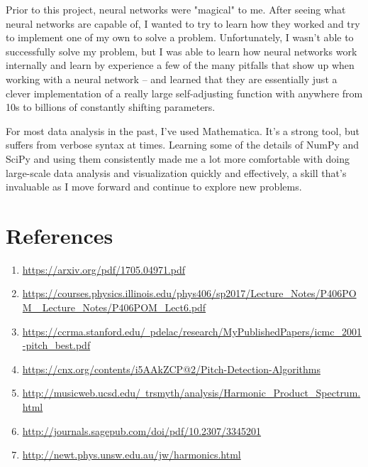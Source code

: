 \documentclass[12pt]{article}
\begin{document}
Prior to this project, neural networks were "magical" to me. After seeing what neural networks are capable of, I wanted to try to learn how they worked and try to implement one of my own to solve a problem. Unfortunately, I wasn't able to successfully solve my problem, but I was able to learn how neural networks work internally and learn by experience a few of the many pitfalls that show up when working with a neural network -- and learned that they are essentially just a clever implementation of a really large self-adjusting function with anywhere from 10s to billions of constantly shifting parameters.

For most data analysis in the past, I've used Mathematica. It's a strong tool, but suffers from verbose syntax at times. Learning some of the details of NumPy and SciPy and using them consistently made me a lot more comfortable with doing large-scale data analysis and visualization quickly and effectively, a skill that's invaluable as I move forward and continue to explore new problems.

\section{References}
\begin{enumerate}
	\item
	\href{https://arxiv.org/pdf/1705.04971.pdf}{https://arxiv.org/pdf/1705.04971.pdf}
	\item \href{https://courses.physics.illinois.edu/phys406/sp2017/Lecture_Notes/P406POM_Lecture_Notes/P406POM_Lect6.pdf}{https://courses.physics.illinois.edu/phys406/sp2017/Lecture\_Notes/P406POM\_ Lecture\_Notes/P406POM\_Lect6.pdf}
	\item
	\href{https://ccrma.stanford.edu/~pdelac/research/MyPublishedPapers/icmc_2001-pitch_best.pdf}{https://ccrma.stanford.edu/~pdelac/research/MyPublishedPapers/icmc\_2001-pitch\_best.pdf}
	\item
	\href{https://cnx.org/contents/i5AAkZCP@2/Pitch-Detection-Algorithms}{https://cnx.org/contents/i5AAkZCP@2/Pitch-Detection-Algorithms}
	\item
	\href{http://musicweb.ucsd.edu/~trsmyth/analysis/Harmonic_Product_Spectrum.html}{http://musicweb.ucsd.edu/~trsmyth/analysis/Harmonic\_Product\_Spectrum.html}
	\item
	\href{http://journals.sagepub.com/doi/pdf/10.2307/3345201}{http://journals.sagepub.com/doi/pdf/10.2307/3345201}
	\item
	\href{http://newt.phys.unsw.edu.au/jw/harmonics.html}{http://newt.phys.unsw.edu.au/jw/harmonics.html}
\end{enumerate}
\end{document}

